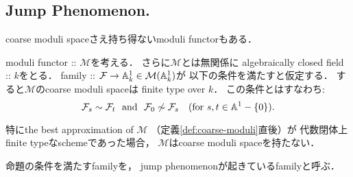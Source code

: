 \documentclass[a4paper]{jsarticle}
\newcommand{\famF}{\mathcal{F}}
\newcommand{\ftorM}{\mathcal{M}}
\newcommand{\mfor}{\text{for }}
\begin{document}
    \subsection{Jump Phenomenon.}
    coarse moduli spaceさえ持ち得ないmoduli functorもある．

    \begin{Prop}
        moduli functor :: $\ftorM$を考える．
        さらに$\ftorM$とは無関係に
        algebraically closed field :: $k$をとる．
        family :: $\famF \to \affine_k^1 \in \ftorM(\affine_k^1)$が
        以下の条件を満たすと仮定する．
        すると$\ftorM$のcoarse moduli spaceは
        finite type over $k$．
        この条件とはすなわち:
        \[
            \famF_{s} \sim \famF_{t}
            \ \mand\ 
            \famF_{0} \not \sim \famF_{s} \quad (\mfor s,t \in \affine^1-\{0\}).
        \]
        
        特にthe best approximation of $\ftorM$ 
        （定義\ref{def:coarse-moduli}直後）が
        代数閉体上finite typeなschemeであった場合，
        $\ftorM$はcoarse moduli spaceを持たない．
    \end{Prop}
    命題の条件を満たすfamilyを，
    jump phenomenonが起きているfamilyと呼ぶ．
\end{document}
